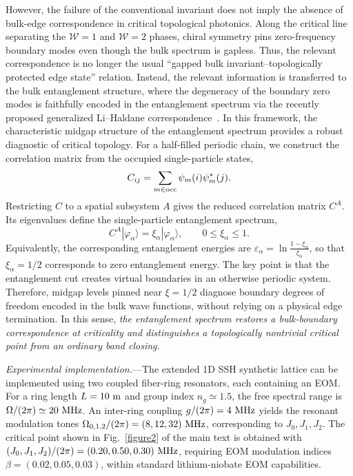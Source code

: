 \documentclass[aps,prl,twocolumn,preprintnumbers,amsmath,amssymb,superscriptaddress,10pt]{revtex4-2}
\begin{document}
However, the failure of the conventional invariant does not imply the absence of bulk-edge correspondence in critical topological photonics. Along the critical line separating the $\mathcal W=1$ and $\mathcal W=2$ phases, chiral symmetry pins zero-frequency boundary modes even though the bulk spectrum is gapless. Thus, the relevant correspondence is no longer the usual ``gapped bulk invariant--topologically protected edge state'' relation. Instead, the relevant information is transferred to the bulk entanglement structure, where the degeneracy of the boundary zero modes is faithfully encoded in the entanglement spectrum via the recently proposed generalized Li--Haldane correspondence~\cite{PhysRevLett.113.106801,guo2025generalized}. In this framework, the characteristic midgap structure of the entanglement spectrum provides a robust diagnostic of critical topology. For a half-filled periodic chain, we
construct the correlation matrix from the occupied single-particle states,
\begin{equation}
C_{ij}=\sum_{m\in {\rm occ}} \psi_m(i)\psi_m^*(j).
\label{eq:app_C_full}
\end{equation}
Restricting $C$ to a spatial subsystem $A$ gives the reduced correlation
matrix $C^A$.  Its eigenvalues define the single-particle entanglement
spectrum,
\begin{equation}
C^A|\varphi_\alpha\rangle
=
\xi_\alpha|\varphi_\alpha\rangle,
\qquad
0\leq \xi_\alpha\leq1 .
\label{eq:app_ES_definition}
\end{equation}
Equivalently, the corresponding entanglement energies are $\varepsilon_\alpha = \ln\frac{1-\xi_\alpha}{\xi_\alpha}$,
so that $\xi_\alpha=1/2$ corresponds to zero entanglement energy.
The key point is that the entanglement cut creates virtual boundaries in an otherwise periodic system.  Therefore, midgap levels pinned near
$\xi=1/2$ diagnose boundary degrees of freedom encoded in the bulk wave functions, without relying on a physical edge termination. In this sense, \textit{the entanglement spectrum restores a bulk-boundary correspondence at criticality and distinguishes a topologically nontrivial critical point from an ordinary band closing.} 

  
\emph{Experimental implementation.}---The extended 1D SSH synthetic lattice can be implemented using two coupled fiber-ring resonators, each containing an EOM.  For a ring length $L=10~{\rm m}$ and group index $n_g\simeq1.5$, the free spectral range is $\Omega/(2\pi)\simeq20~{\rm MHz}$. An inter-ring coupling $g/(2\pi)=4~{\rm MHz}$ yields the resonant modulation tones $\Omega_{0,1,2}/(2\pi)=(8,12,32)~{\rm MHz}$, corresponding to $J_0,J_1,J_2$. The critical point shown in Fig.~\ref{figure2} of the main text is obtained with $(J_0,J_1,J_2)/(2\pi)=(0.20,0.50,0.30)~{\rm MHz}$, requiring EOM modulation indices $\beta=(0.02,0.05,0.03)$, within standard lithium-niobate EOM capabilities.
\end{document}
